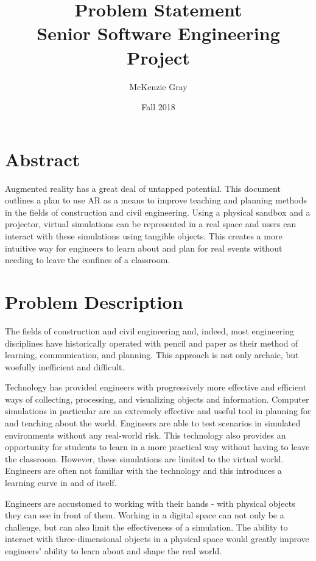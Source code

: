 \documentclass{article}
\title{Problem Statement \\
Senior Software Engineering Project}
\author{McKenzie Gray}
\date{Fall 2018}
\begin{document}
\maketitle

\vfill %
\section*{Abstract}
Augmented reality has a great deal of untapped potential. This document outlines a plan to use AR as a means to improve teaching and planning methods in the fields of construction and civil engineering. Using a physical sandbox and a projector, virtual simulations can be represented in a real space and users can interact with these simulations using tangible objects. This creates a more intuitive way for engineers to learn about and plan for real events without needing to leave the confines of a classroom.

\newpage

\section{Problem Description}
The fields of construction and civil engineering and, indeed, most engineering disciplines have historically operated with pencil and paper as their method of learning, communication, and planning. This approach is not only archaic, but woefully inefficient and difficult.

Technology has provided engineers with progressively more effective and efficient ways of collecting, processing, and visualizing objects and information. Computer simulations in particular are an extremely effective and useful tool in planning for and teaching about the world. Engineers are able to test scenarios in simulated environments without any real-world risk. This technology also provides an opportunity for students to learn in a more practical way without having to leave the classroom. However, these simulations are limited to the virtual world. Engineers are often not familiar with the technology and this introduces a learning curve in and of itself. 

Engineers are accustomed to working with their hands - with physical objects they can see in front of them. Working in a digital space can not only be a challenge, but can also limit the effectiveness of a simulation. The ability to interact with three-dimensional objects in a physical space would greatly improve engineers' ability to learn about and shape the real world.
\end{document}
